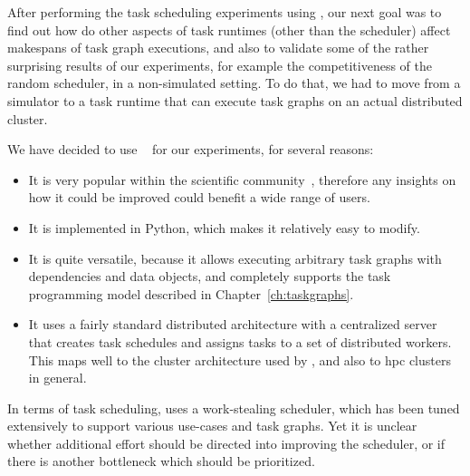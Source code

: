 After performing the task scheduling experiments using \estee{}, our next goal
was to find out how do other aspects of task runtimes (other than the scheduler) affect makespans
of task graph executions, and also to validate some of the rather surprising results of our
experiments, for example the competitiveness of the random scheduler, in a non-simulated setting.
To do that, we had to move from a simulator to a task runtime that can execute task graphs on an
actual distributed cluster.

We have decided to use \dask{}~\cite{dask} for our experiments,
for several reasons:
\begin{itemize}
	\setlength\itemsep{0.1em}
	\item It is very popular within the scientific community~\cite{dask-user-survey}, therefore any
	      insights on how it could be improved could benefit a wide range of users.
	\item It is implemented in Python, which makes it relatively easy to modify.
	\item It is quite versatile, because it allows executing arbitrary task graphs with dependencies and data
	      objects, and completely supports the task programming model described in
	      Chapter~\ref{ch:taskgraphs}.
	\item It uses a fairly standard distributed architecture with a centralized server that creates task
	      schedules and assigns tasks to a set of distributed workers. This maps well to the cluster
	      architecture used by \estee{}, and also to \gls{hpc} clusters in
	      general.
\end{itemize}

In terms of task scheduling, \dask{} uses a work-stealing scheduler, which has
been tuned extensively to support various use-cases and task graphs. Yet it is unclear whether
additional effort should be directed into improving the scheduler, or if there is another
bottleneck which should be prioritized.

